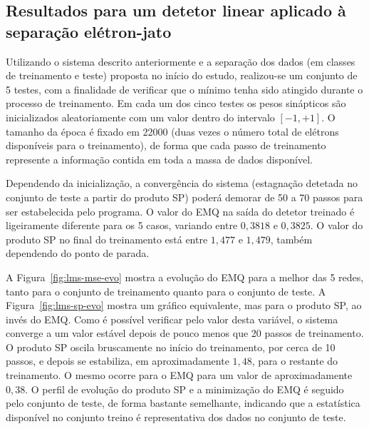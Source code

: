 \subsection{Resultados para um detetor linear aplicado à separação
e\-lé\-tron-jato}

Utilizando o sistema descrito anteriormente e a separação dos dados (em
classes de treinamento e teste) proposta no início do estudo, realizou-se um
conjunto de 5 testes, com a finalidade de verificar que o mínimo tenha sido
atingido durante o processo de treinamento. Em cada um dos cinco testes os
pesos sinápticos são inicializados aleatoriamente com um valor dentro do
intervalo $[-1, +1]$. O tamanho da época é fixado em 22000 (duas vezes o
número total de elétrons disponíveis para o treinamento), de forma que cada
passo de treinamento represente a informação contida em toda a massa de dados
disponível. 

Dependendo da inicialização, a convergência do sistema (estagnação detetada no
conjunto de teste a partir do produto SP) poderá demorar de 50 a 70 passos
para ser estabelecida pelo programa. O valor do EMQ na saída do detetor
treinado é ligeiramente diferente para os 5 casos, variando entre $0,3818$ e
$0,3825$. O valor do produto SP no final do treinamento está entre $1,477$ e
$1,479$, também dependendo do ponto de parada.

A Figura~\ref{fig:lms-mse-evo} mostra a evolução do EMQ para a melhor das 5
redes, tanto para o conjunto de treinamento quanto para o conjunto de teste. A
Figura~\ref{fig:lms-sp-evo} mostra um gráfico equivalente, mas para o produto
SP, ao invés do EMQ. Como é possível verificar pelo valor desta variável, o
sistema converge a um valor estável depois de pouco menos que 20 passos de
treinamento. O produto SP oscila bruscamente no início do treinamento, por
cerca de 10 passos, e depois se estabiliza, em aproximadamente $1,48$, para o
restante do treinamento. O mesmo ocorre para o EMQ para um valor de
aproximadamente $0,38$. O perfil de evolução do produto SP e a minimização do
EMQ é seguido pelo conjunto de teste, de forma bastante semelhante, indicando
que a estatística disponível no conjunto treino é representativa dos dados
no conjunto de teste.


